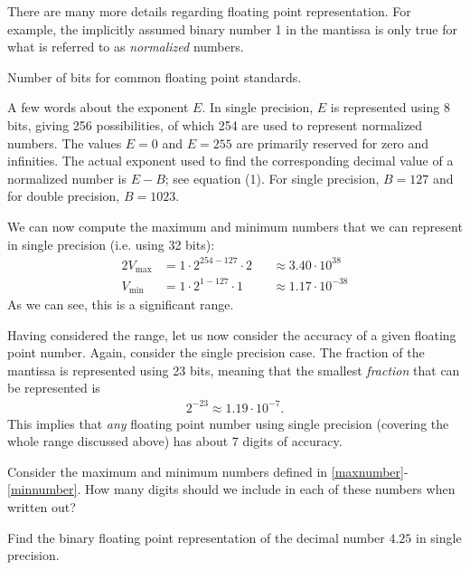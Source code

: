 There are many more details regarding floating point representation. For
example, the implicitly assumed binary number 1 in the mantissa is only true for
what is referred to as {\em normalized} numbers.

\begin{table}
  \centering
  \caption{Number of bits for common floating point standards.}
  
\end{table}

A few words about the exponent $E$. In single precision, $E$ is represented
using 8 bits, giving 256 possibilities, of which 254 are used to represent
normalized numbers. The values $E=0$ and $E=255$ are primarily reserved for zero
and infinities. The actual exponent used to find the corresponding decimal value
of a normalized number is $E-B$; see equation (1). For single precision,
$B=127$ and for double precision, $B=1023$.

We can now compute the maximum and minimum numbers that we can represent in
single precision (i.e. using 32 bits):
\begin{alignat}{2}
  \label{maxnumber}
  V_{\text{max}} &= 1 \cdot 2^{254-127} \cdot 2 &&\approx 3.40 \cdot 10^{38} \\
  \label{minnumber}
  V_{\text{min}} &= 1\cdot 2^{1-127} \cdot 1 &&\approx 1.17 \cdot 10^{-38}
\end{alignat}
As we can see, this is a significant range.

Having considered the range, let us now consider the accuracy of a given
floating point number. Again, consider the single precision case. The fraction
of the mantissa is represented using 23 bits, meaning that the smallest {\em
fraction} that can be represented is
\begin{align*}
  2^{-23} \approx 1.19 \cdot 10^{-7}.
\end{align*}
This implies that {\em any} floating point number using single precision
(covering the whole range discussed above) has about 7 digits of accuracy.

\begin{ex}
  Consider the maximum and minimum numbers defined in
  \eqref{maxnumber}-\eqref{minnumber}. How many digits should we include in each
  of these numbers when written out?
\end{ex}

\begin{ex}
  Find the binary floating point representation of the decimal number $4.25$ in
  single precision.
\end{ex}

